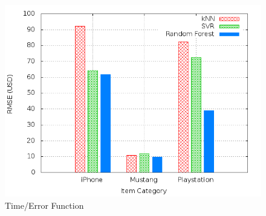 \begin{figure}
\centering
\includegraphics[scale=0.55]{images/plots/machine_learning/plot_price_regression_rmse.png}
\caption{Time/Error Function}
\label{crowdsourcing_desc_length}
\end{figure}


